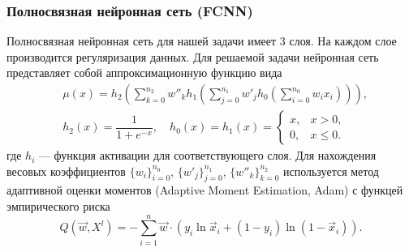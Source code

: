 \documentclass[compress,professionalfont]{beamer}
\begin{document}
\begin{frame}[fragile=singleslide]
\frametitle{Полносвязная нейронная сеть (FCNN)}
\small

Полносвязная нейронная сеть для нашей задачи имеет 3 слоя. На каждом слое производится регуляризация данных.
%
Для решаемой задачи нейронная сеть представляет собой аппроксимационную функцию вида
\begin{align*}
& \mu(x) = h_2 \left(\sum_{k=0}^{n_2} w''_k h_1\left(\sum_{j=0}^{n_1} w'_j h_0\left( \sum_{i=0}^{n_0} w_i x_i \right)\right)\right), \\
& h_2(x) = \dfrac{1}{1+e^{-x}}, \quad h_0(x) = h_1(x) = 
\begin{cases} 
x, & x > 0, \\
0, & x \leqslant 0.
\end{cases}
\end{align*}
где $h_i$ --- функция активации для соответствующего слоя. Для нахождения весовых коэффициентов $\{w_i\}_{i=0}^{n_0}$, $\{w'_j\}_{j=0}^{n_1}$, $\{w''_k\}_{k=0}^{n_2}$ используется метод адаптивной оценки моментов (Adaptive Moment Estimation, Adam) с функцей эмпирического риска
$$
Q\left(\vec{w}, X^l\right) = - \sum_{i=1}^{n} \vec{w} \cdot (y_i \ln \vec{x}_i + (1 - y_i)\ln (1 - \vec{x}_i)).
$$

\end{frame}
\end{document}
